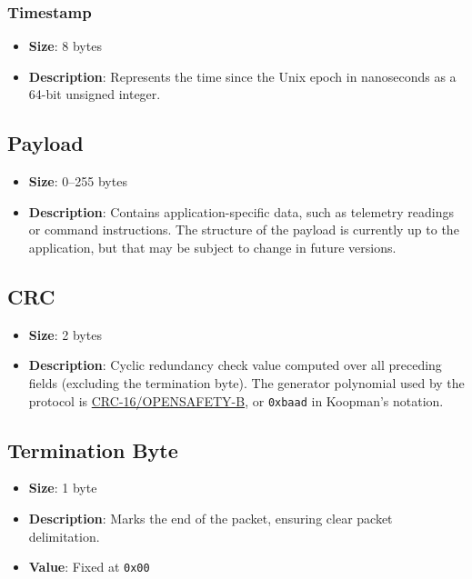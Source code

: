 \documentclass[a4paper,11pt,english]{article}
\begin{document}
\subsubsection{Timestamp}
\begin{itemize}
  \item \textbf{Size}: 8 bytes
  \item \textbf{Description}: Represents the time since the Unix epoch in nanoseconds as a 64-bit unsigned integer.
\end{itemize}

\subsection{Payload}
\begin{itemize}
  \item \textbf{Size}: 0–255 bytes
  \item \textbf{Description}: Contains application-specific data, such as telemetry readings or command instructions. The structure of the payload is currently up to the application, but that may be subject to change in future versions.
\end{itemize}

\subsection{CRC}
\begin{itemize}
  \item \textbf{Size}: 2 bytes
  \item \textbf{Description}: Cyclic redundancy check value computed over all preceding fields (excluding the termination byte). The generator polynomial used by the protocol is \href{https://reveng.sourceforge.io/crc-catalogue/all.htm#crc.cat.crc-16-opensafety-b}{CRC-16/OPENSAFETY-B}, or \texttt{0xbaad} in Koopman's notation.
\end{itemize}

\subsection{Termination Byte}
\begin{itemize}
  \item \textbf{Size}: 1 byte
  \item \textbf{Description}: Marks the end of the packet, ensuring clear packet delimitation.
  \item \textbf{Value}: Fixed at \texttt{0x00}
\end{itemize}
\end{document}

